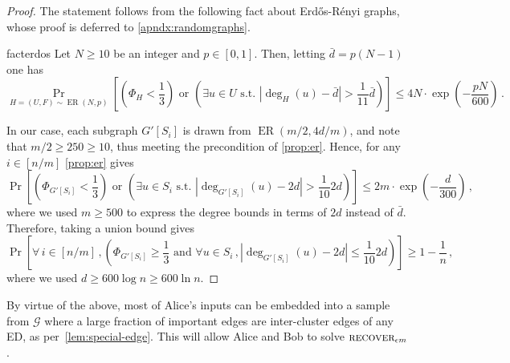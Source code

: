 \documentclass[epsfig,letter,11pt]{article}
\numberwithin{equation}{section}
\DeclareMathOperator*{\er}{ER}
\DeclareMathOperator*{\recover}{\textsc{recover}}
\begin{document}
\begin{proof}
	The statement follows from the following fact about Erd\H{o}s-R\'{e}nyi graphs, whose proof is deferred to \cref{apndx:randomgraphs}.
	\begin{restatable}{fact}{erdos}
		\label{prop:er}
		Let $N \ge 10$ be an integer and $p \in [0,1]$. Then, letting $\bar{d} = p(N-1)$ one has
		\begin{equation*}
			\Pr_{H=(U,F) \sim \er(N,p)}\left[\left(\Phi_H < \frac{1}{3} \right)\text{ or } \left(\exists u \in U \text{ s.t. } \left|\deg_H(u)-\bar{d}\right|>\frac{1}{11} \bar{d}\right)\right] \le 4N \cdot \exp\left(-\frac{pN}{600}\right) \, .
		\end{equation*}
	\end{restatable}
	
	\noindent
	In our case, each subgraph $G'[S_i]$ is drawn from $\er({m}/{2}, 4d/m)$, and note that $m/2 \ge 250 \ge 10$, thus meeting the precondition of \cref{prop:er}. Hence, for any $i \in [n/m]$ \cref{prop:er} gives
	\begin{equation*}
		\Pr\left[\left(\Phi_{G'[S_i]} < \frac{1}{3}\right) \text{ or } \left(\exists u \in S_i \text{ s.t. } \left|\deg_{G'[S_i]}(u)-2d\right|>\frac{1}{10}2d\right)\right] \le 2m \cdot \exp\left(-\frac{d}{300}\right) \, ,
	\end{equation*}
	where we used $m \ge 500$ to express the degree bounds in terms of $2d$ instead of $\bar{d}$.
	Therefore, taking a union bound gives
	\begin{equation*}
		\Pr\left[\forall \, i \in [n/m]\, , \left( \Phi_{G'[S_i]} \ge \frac{1}{3} \text{ and } \forall u \in S_i\, , \left|\deg_{G'[S_i]}(u)-2d\right|\le\frac{1}{10} 2d\right)\right] \ge1- \frac{1}{n} \, ,
	\end{equation*}
	where we used $d \ge 600 \log n \ge 600 \ln n$.
\end{proof}
\noindent
By virtue of the above, most of Alice's inputs  can be embedded into a sample from $\mathcal{G}$ where a large fraction of important edges are inter-cluster edges of any ED, as per~\cref{lem:special-edge}. This will allow Alice and Bob to solve $\recover_{\epsilon m}$.
\end{document}
